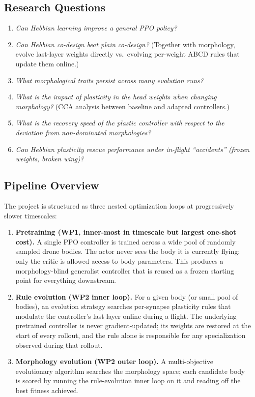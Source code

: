 \documentclass[letterpaper,10pt]{article}
\begin{document}
\subsection{Research Questions}
    \begin{enumerate}
        \item \textit{Can Hebbian learning improve a general PPO policy?}
        \item \textit{Can Hebbian co-design beat plain co-design?} (Together with morphology, evolve last-layer weights directly vs.\ evolving per-weight ABCD rules that update them online.)
        \item \textit{What morphological traits persist across many evolution runs?}
        \item \textit{What is the impact of plasticity in the head weights when changing morphology?} (CCA analysis between baseline and adapted controllers.)
        \item \textit{What is the recovery speed of the plastic controller with respect to the deviation from non-dominated morphologies?}
        \item \textit{Can Hebbian plasticity rescue performance under in-flight ``accidents'' (frozen weights, broken wing)?}
    \end{enumerate}

\subsection{Pipeline Overview}

The project is structured as three nested optimization loops at progressively slower timescales:
\begin{enumerate}
    \item \textbf{Pretraining (WP1, inner-most in timescale but largest one-shot cost).} A single PPO controller is trained across a wide pool of randomly sampled drone bodies. The actor never sees the body it is currently flying; only the critic is allowed access to body parameters. This produces a morphology-blind generalist controller that is reused as a frozen starting point for everything downstream.
    \item \textbf{Rule evolution (WP2 inner loop).} For a given body (or small pool of bodies), an evolution strategy searches per-synapse plasticity rules that modulate the controller's last layer online during a flight. The underlying pretrained controller is never gradient-updated; its weights are restored at the start of every rollout, and the rule alone is responsible for any specialization observed during that rollout.
    \item \textbf{Morphology evolution (WP2 outer loop).} A multi-objective evolutionary algorithm searches the morphology space; each candidate body is scored by running the rule-evolution inner loop on it and reading off the best fitness achieved.
\end{enumerate}
\end{document}

